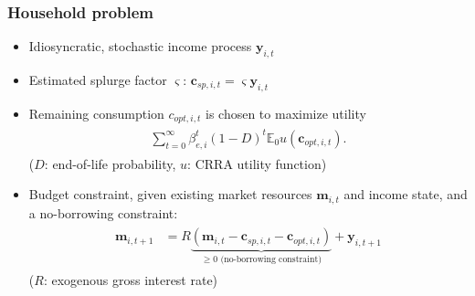 \documentclass[pdflatex,aspectratio=169]{beamer}
\begin{document}
\begin{frame}
  \frametitle{Household problem}
  \begin{itemize}[<+->]
    \item
          Idiosyncratic, stochastic income process $\mathbf{y}_{i,t}$
    \item
          Estimated splurge factor $\varsigma$: $\mathbf{c}_{sp,i,t} = \varsigma \mathbf{y}_{i,t}$
          \pause
    \item
          Remaining consumption $c_{opt,i,t}$ is chosen to maximize utility
          \begin{equation}
            \begin{gathered}
              \begin{aligned}
                \sum_{t=0}^{\infty}\beta_{e,i}^t (1-D)^t \mathbb{E}_0 u(\mathbf{c}_{opt,i,t}).
              \end{aligned}
            \end{gathered}
          \end{equation}
          ($D$: end-of-life probability, $u$: CRRA utility function)
    \item
          Budget constraint, given existing market resources $\mathbf{m}_{i,t}$ and income state, and a no-borrowing constraint:
          \begin{equation}
            \begin{gathered}
              \begin{aligned}
                \mathbf{m}_{i,t+1} & = R \underbrace{(\mathbf{m}_{i,t} - \mathbf{c}_{sp,i,t} - \mathbf{c}_{opt,i,t})}_{\geq 0 \text{ (no-borrowing constraint)}} + \mathbf{y}_{i,t+1}
              \end{aligned}
            \end{gathered}
          \end{equation}
          ($R$: exogenous gross interest rate)
  \end{itemize}
\end{frame}
\end{document}

